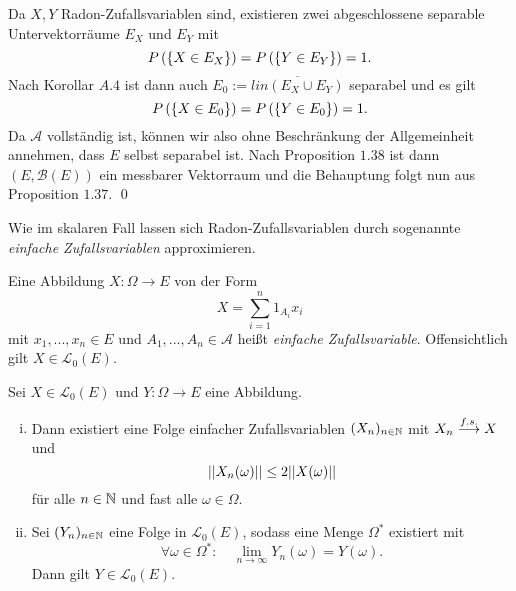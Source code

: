 \begin{proof*}
    Da $X,Y$ Radon-Zufallsvariablen sind, existieren zwei abgeschlossene separable Untervektorräume $E_X$ und $E_Y$ mit 
    $$
        P\left(\left\{ X \in E_X \right\}\right) = P\left(\left\{ Y \in E_Y \right\}\right) = 1. 
    $$
    Nach Korollar $A.4$ ist dann auch $E_0 := \overline{lin(E_X \cup E_Y)}$ separabel und es gilt 
    $$
        P\left(\left\{ X \in E_0 \right\}\right) = P\left(\left\{ Y \in E_0 \right\}\right) = 1. 
    $$
    Da $\mathcal{A}$ vollständig ist, können wir also ohne Beschränkung der Allgemeinheit annehmen, dass $E$ selbst separabel ist. 
    Nach Proposition $1.38$ ist dann $(E, \mathcal{B}(E))$ ein messbarer Vektorraum und die Behauptung folgt nun aus Proposition $1.37$. \qed 
\end{proof*}

Wie im skalaren Fall lassen sich Radon-Zufallsvariablen durch sogenannte \textit{einfache Zufallsvariablen} approximieren. 

\begin{mydef}
    Eine Abbildung $X:\Omega \to E$ von der Form 
    $$
        X = \sum_{i=1}^n 1_{A_i}x_i
    $$
    mit $x_1,...,x_n \in E$ und $A_1,..., A_n \in \mathcal{A}$ heißt \textit{einfache Zufallsvariable}. Offensichtlich gilt $X \in \mathcal{L}_0(E)$. 
\end{mydef}


\begin{proposition}
    Sei $X \in \mathcal{L}_0(E)$ und $Y: \Omega \to E$ eine Abbildung. 
    \begin{enumerate}[(i)]
        \item Dann existiert eine Folge einfacher Zufallsvariablen $(X_n)_{n \in \mathbb{N}}$ mit $X_n \overset{f.s.}{\longrightarrow} X$ und 
        $$
            \lvert\lvert X_n(\omega) \rvert\rvert \leq 2 \lvert\lvert X(\omega) \rvert\rvert
        $$
        für alle $n \in \mathbb{N}$ und fast alle $\omega \in \Omega$. 
        \item Sei $(Y_n)_{n \in \mathbb{N}}$ eine Folge in $\mathcal{L}_0(E)$, sodass eine Menge $\Omega^*$ existiert mit 
        $$
            \forall \omega \in \Omega^*: \quad \lim_{n \to \infty}Y_n(\omega) = Y(\omega). 
        $$
        Dann gilt $Y \in \mathcal{L}_0(E)$. 
    \end{enumerate}
\end{proposition}

